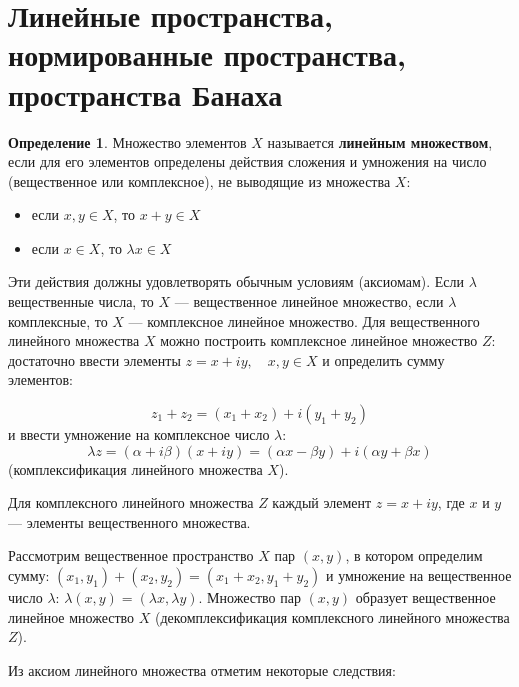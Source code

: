 \documentclass[12pt,a4paper,titlepage,oneside]{book}
\theoremstyle{definition}
\newtheorem*{definition}{Определение}
\theoremstyle{plain}
\theoremstyle{remark}
\theoremstyle{remark}
\theoremstyle{remark}
\theoremstyle{remark}
\theoremstyle{plain}
\theoremstyle{plain}
\begin{document}
\section{Линейные пространства, нормированные пространства, пространства Банаха}

\begin{definition}

Множество элементов $X$ называется \textbf{линейным множеством}, если для его элементов определены действия сложения и умножения на число (вещественное или комплексное), не выводящие из множества $X$:

\begin{itemize}

	\item если $x,y\in X$, то $x+y\in X$

	\item если $x\in X$, то $\lambda x\in X$

\end{itemize}

\end{definition}


Эти действия должны удовлетворять обычным условиям (аксиомам). Если $\lambda$ вещественные числа, то $X$ --- вещественное линейное множество, если $\lambda$ комплексные, то $X$ --- комплексное линейное множество. Для вещественного линейного множества $X$ можно построить комплексное линейное множество $Z$: достаточно ввести элементы $z=x+iy,\quad x,y \in X$ и определить сумму элементов:

\begin{equation*}
z_1+z_2=(x_1+x_2)+i(y_1+y_2)
\end{equation*}
и ввести умножение на комплексное число $\lambda$:
\begin{equation*}
\lambda z = (\alpha + i\beta)(x+iy) = (\alpha x - \beta y)+i(\alpha y + \beta x)
\end{equation*}
(комплексификация линейного множества $X$).

Для комплексного линейного множества $Z$ каждый элемент $z=x+iy$, где $x$ и $y$ --- элементы вещественного множества.

Рассмотрим вещественное пространство $X$ пар $(x,y)$, в котором определим сумму: $(x_1,y_1)+(x_2,y_2) = (x_1+x_2,y_1+y_2)$ и умножение на вещественное число $\lambda$: $\lambda(x,y) = (\lambda x, \lambda y)$. Множество пар $(x,y)$ образует вещественное линейное множество  $X$ (декомплексификация комплексного линейного множества $Z$).

Из аксиом линейного множества отметим некоторые следствия:
\end{document}
